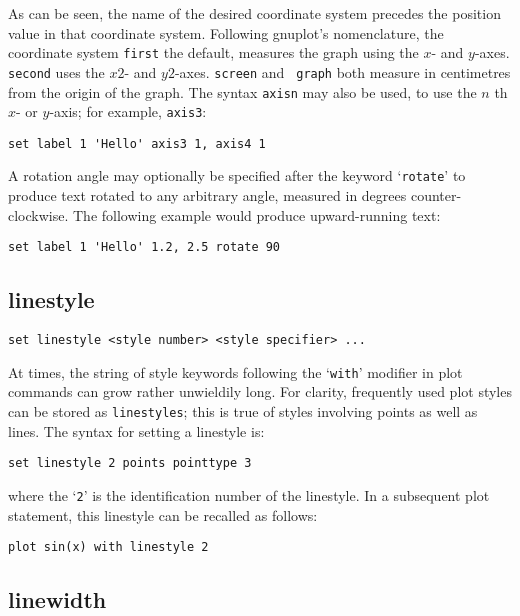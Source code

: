 As can be seen, the name of the desired coordinate system precedes the position
value in that coordinate system. Following gnuplot's nomenclature, the
coordinate system {\tt first} the default, measures the graph using the $x$- and
$y$-axes. {\tt second} uses the $x2$- and $y2$-axes.  {\tt screen} and {\tt
graph} both measure in centimetres from the origin of the graph.  The syntax
{\tt axisn} may also be used, to use the $n$ th $x$- or $y$-axis; for example,
{\tt axis3}:

\begin{verbatim}
set label 1 'Hello' axis3 1, axis4 1
\end{verbatim}

A rotation angle may optionally be specified after the keyword `{\tt rotate}'
to produce text rotated to any arbitrary angle, measured in degrees
counter-clockwise. The following example would produce upward-running text:

\begin{verbatim}
set label 1 'Hello' 1.2, 2.5 rotate 90
\end{verbatim}


\subsection{linestyle}

\begin{verbatim}
set linestyle <style number> <style specifier> ...
\end{verbatim}

At times, the string of style keywords following the `{\tt with}' modifier in plot
commands can grow rather unwieldily long. For clarity, frequently used plot
styles can be stored as {\tt linestyles}; this is true of styles involving
points as well as lines. The syntax for setting a linestyle is:

\begin{verbatim}
set linestyle 2 points pointtype 3
\end{verbatim}

\noindent where the `{\tt 2}' is the identification number of the linestyle. In a subsequent
plot statement, this linestyle can be recalled as follows:

\begin{verbatim}
plot sin(x) with linestyle 2
\end{verbatim}


\subsection{linewidth}

